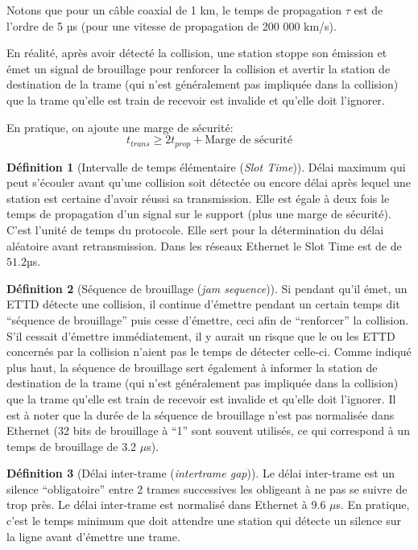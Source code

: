 \documentclass[11pt,english,french]{scrreprt}
\theoremstyle{remark}
\theoremstyle{definition}
\newtheorem*{def*}{Définition}
\begin{document}
Notons que pour un câble coaxial de 1 km, le temps de propagation $\tau$ est de l’ordre de 5 µs (pour une vitesse de propagation de 200 000 km/s).

En réalité, après avoir détecté la collision, une station stoppe son émission et émet un signal de brouillage pour renforcer la collision et avertir la station de destination de la trame (qui n’est généralement pas impliquée dans la collision) que la trame qu’elle est train de recevoir est invalide et qu’elle doit l’ignorer.

En pratique, on ajoute une marge de sécurité:
\[
           t_{trans} \ge 2 t_{prop} + \textrm{Marge de sécurité}
\]

\begin{def*}[Intervalle de temps élémentaire (\emph{Slot Time})]
	Délai maximum qui peut s'écouler avant qu'une collision soit détectée ou encore délai après lequel une station est certaine d'avoir réussi sa transmission. Elle est égale à deux fois le temps de propagation d'un signal sur le support (plus une marge de sécurité). C'est l'unité de temps du protocole. Elle sert pour la détermination du délai aléatoire avant retransmission. Dans les réseaux Ethernet le Slot Time est de de $51.2 µ$s.
\end{def*}

\begin{def*}[Séquence de brouillage (\emph{jam sequence})]
	Si pendant qu'il émet, un ETTD détecte une collision, il continue d'émettre pendant un certain temps dit ``séquence de brouillage'' puis cesse d'émettre, ceci afin de ``renforcer'' la collision. S'il cessait d'émettre immédiatement, il y aurait un risque que le ou les ETTD concernés par la collision n'aient pas le temps de détecter celle-ci. Comme indiqué plus haut, la séquence de brouillage sert également à informer la station de destination de la trame (qui n’est généralement pas impliquée dans la collision) que la trame qu’elle est train de recevoir est invalide et qu’elle doit l’ignorer. Il est à noter que la durée de la séquence de brouillage n’est pas normalisée dans Ethernet (32 bits de brouillage à ``1'' sont souvent utilisés, ce qui correspond à un temps de brouillage de 3.2 $\mu$s).
\end{def*}

\begin{def*}[Délai inter-trame (\emph{intertrame gap})]
	Le délai inter-trame est un silence ``obligatoire'' entre 2 trames successives les obligeant à ne pas se suivre de trop près. Le délai inter-trame est normalisé dans Ethernet à 9.6 $\mu$s. En pratique, c’est le temps minimum que doit attendre une station qui détecte un silence sur la ligne avant d’émettre une trame.
\end{def*}
\end{document}
